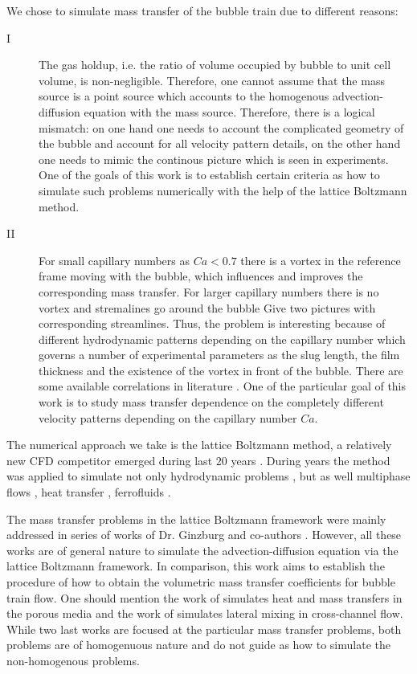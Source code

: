 \documentclass{article}
\begin{document}
We chose to simulate mass transfer of the bubble train due to different reasons:
\begin{description}
\item[I] The gas holdup, i.e. the ratio of volume occupied by bubble to unit cell volume, is
non-negligible. Therefore, one cannot assume that the mass source is a point source which accounts
to the homogenous advection-diffusion equation with the mass source.  Therefore, there is a logical
mismatch: on one hand one needs to account the complicated geometry of the bubble and account for
all velocity pattern details, on the other hand one needs to mimic the continous picture which is
seen in experiments. One of the goals of this work is to establish certain criteria as how to
simulate such problems numerically with the help of the lattice Boltzmann method.
\item[II] For small capillary numbers as $Ca<0.7$ \cite{giavedoni-numerical} there is a vortex in
the reference frame moving with
the bubble, which  influences and improves the corresponding mass transfer.  For larger capillary
numbers there is no vortex and stremalines go around the bubble {\color{red} Give two pictures
with corresponding streamlines}. Thus, the problem is interesting because of different
hydrodynamic patterns depending on the capillary number which governs a number of experimental
parameters as the slug length, the film thickness and the existence of the vortex in front of the
bubble. There are some available
correlations in literature \cite{bercic-mass,kreutzer-overview}. One of the particular goal of
this work is to study mass transfer dependence on the completely different velocity patterns
depending on the capillary number $Ca$. 
\end{description}
 
The numerical approach we take is the lattice Boltzmann method, a relatively new CFD
competitor emerged during last $20$ years \cite{frisch,mcnamara,HJ,HSB}. During years the
method was applied to simulate not only hydrodynamic problems \cite{yu}, but as well multiphase
flows \cite{Shan-chen:extended,swift,gunstensen}, heat transfer
\cite{yuan-thermal,zhang-thermal}, ferrofluids \cite{dellar-ferro,kuzmin-aniso}.

The mass transfer problems in the lattice Boltzmann framework were mainly addressed in series of
works of Dr. Ginzburg and co-authors
\cite{ginzburg-main,ginzburg-boundary-conditions,ginzburg-saturated-flow}. However, all these works
are of general nature to simulate the advection-diffusion equation via the lattice Boltzmann
framework. In comparison, this work aims to establish the procedure of how to obtain the
volumetric mass transfer coefficients for bubble train flow. One should mention the work of
\citet{inamuro-scalar-boundary} simulates heat and mass transfers in the porous media and the work
of \citet{jos-mass} simulates lateral mixing in cross-channel flow. While two last works are focused
at the particular mass transfer problems, both problems are of homogenuous nature and do not
guide as how to simulate the non-homogenous problems.           
\end{document}

